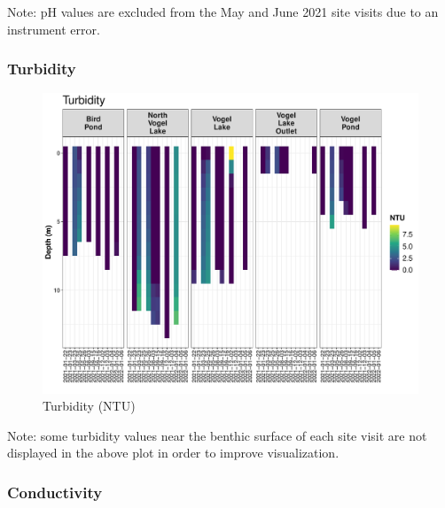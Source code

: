 \documentclass[
]{book}
\begin{document}
Note: pH values are excluded from the May and June 2021 site visits due to an instrument error.

\hypertarget{turbidity}{%
\subsubsection{Turbidity}\label{turbidity}}

\begin{figure}
\centering
\includegraphics{Miller_Creek_Vogel_Lake_Water_Quality_files/figure-latex/unnamed-chunk-12-1.pdf}
\caption{\label{fig:unnamed-chunk-12}Turbidity (NTU)}
\end{figure}

Note: some turbidity values near the benthic surface of each site visit are not displayed in the above plot in order to improve visualization.

\hypertarget{conductivity}{%
\subsubsection{Conductivity}\label{conductivity}}
\end{document}
